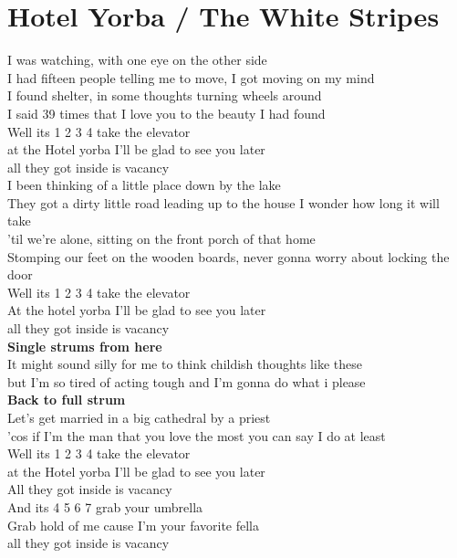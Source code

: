 \section{Hotel Yorba / The White Stripes}\label{sec:hotelyorba}

\Gmajor
\Cmajor
\DmajorEasy	

I was watching, with one eye on the other side\\
I had fifteen people telling me to move, I got moving on my mind\\
I found shelter, in some thoughts turning wheels around\\
I said 39 times that I love you to the beauty I had found\\
Well its 1 2 3 4 take the elevator\\
at the Hotel yorba I'll be glad to see you later\\
all they got inside is vacancy   \\
I been thinking of a little place down by the lake\\
They got a dirty little road leading up to the house I wonder how long it will take\\
'til we're alone, sitting on the front porch of that home\\
Stomping our feet on the wooden boards, never gonna worry about locking the door\\
Well its 1 2 3 4 take the elevator\\
At the hotel yorba I'll be glad to see you later\\
all they got inside is vacancy   \\
\textbf{Single strums from here}\\
It might sound silly for me to think childish thoughts like these\\
but I'm so tired of acting tough and I'm gonna do what i please\\
\textbf{Back to full strum}\\
Let's get married in a big cathedral by a priest\\
'cos if I'm the man that you love the most you can say I do at least\\
Well its 1 2 3 4 take the elevator\\
at the Hotel yorba I'll be glad to see you later\\
All they got inside is vacancy   \\
And its 4 5 6 7 grab your umbrella\\
Grab hold of me cause I'm your favorite fella\\
all they got inside is vacancy    \\
